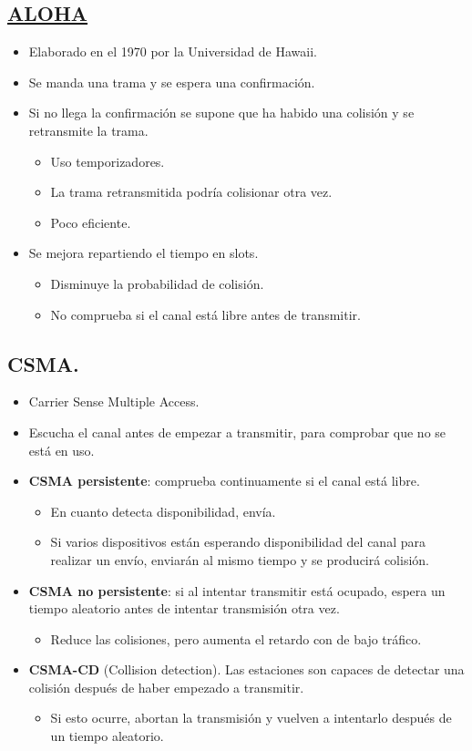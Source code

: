\documentclass{article}
\begin{document}
\subsection{\href{https://es.wikipedia.org/wiki/ALOHAnet}{ALOHA}}
\label{sec:orgbd771a3}
\begin{itemize}
\item Elaborado en el 1970 por la Universidad de Hawaii.
\item Se manda una trama y se espera una confirmación.
\item Si no llega la confirmación se supone que ha habido una colisión y se retransmite la trama. 
\begin{itemize}
\item Uso temporizadores.
\item La trama retransmitida podría colisionar otra vez.
\item Poco eficiente.
\end{itemize}
\item Se mejora repartiendo el tiempo en slots. 
\begin{itemize}
\item Disminuye la probabilidad de colisión.
\item No comprueba si el canal está libre antes de transmitir.
\end{itemize}
\end{itemize}


\subsection{CSMA.}
\label{sec:orga79fe3f}
\begin{itemize}
\item Carrier Sense Multiple Access.
\item Escucha el canal antes de empezar a transmitir, para comprobar que no se está en uso.
\item \textbf{CSMA persistente}: comprueba continuamente si el canal está libre.
\begin{itemize}
\item En cuanto detecta disponibilidad, envía.
\item Si varios dispositivos están esperando disponibilidad del canal para realizar un envío, enviarán al mismo tiempo y se producirá colisión.
\end{itemize}
\item \textbf{CSMA no persistente}: si al intentar transmitir está ocupado, espera un tiempo aleatorio antes de intentar transmisión otra vez. 
\begin{itemize}
\item Reduce las colisiones, pero aumenta el retardo con de bajo tráfico.
\end{itemize}
\item \textbf{CSMA-CD} (Collision detection). Las estaciones son capaces de detectar una colisión después de haber empezado a transmitir. 
\begin{itemize}
\item Si esto ocurre, abortan la transmisión y vuelven a intentarlo después de un tiempo aleatorio.
\end{itemize}
\end{itemize}
\end{document}
